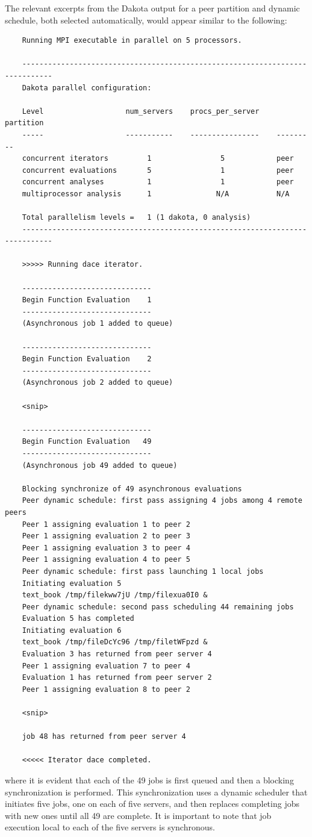 The relevant excerpts from the Dakota output for a peer
partition and dynamic schedule, both selected automatically, would appear 
similar to the following:
\begin{small}
\begin{verbatim}
    Running MPI executable in parallel on 5 processors.

    -----------------------------------------------------------------------------
    Dakota parallel configuration:

    Level                   num_servers    procs_per_server    partition
    -----                   -----------    ----------------    ---------
    concurrent iterators         1                5            peer
    concurrent evaluations       5                1            peer
    concurrent analyses          1                1            peer
    multiprocessor analysis      1               N/A           N/A

    Total parallelism levels =   1 (1 dakota, 0 analysis)
    -----------------------------------------------------------------------------

    >>>>> Running dace iterator.

    ------------------------------
    Begin Function Evaluation    1
    ------------------------------
    (Asynchronous job 1 added to queue)

    ------------------------------
    Begin Function Evaluation    2
    ------------------------------
    (Asynchronous job 2 added to queue)

    <snip>

    ------------------------------
    Begin Function Evaluation   49
    ------------------------------
    (Asynchronous job 49 added to queue)

    Blocking synchronize of 49 asynchronous evaluations
    Peer dynamic schedule: first pass assigning 4 jobs among 4 remote peers
    Peer 1 assigning evaluation 1 to peer 2
    Peer 1 assigning evaluation 2 to peer 3
    Peer 1 assigning evaluation 3 to peer 4
    Peer 1 assigning evaluation 4 to peer 5
    Peer dynamic schedule: first pass launching 1 local jobs
    Initiating evaluation 5
    text_book /tmp/filekww7jU /tmp/filexua0I0 &
    Peer dynamic schedule: second pass scheduling 44 remaining jobs
    Evaluation 5 has completed
    Initiating evaluation 6
    text_book /tmp/fileDcYc96 /tmp/filetWFpzd &
    Evaluation 3 has returned from peer server 4
    Peer 1 assigning evaluation 7 to peer 4
    Evaluation 1 has returned from peer server 2
    Peer 1 assigning evaluation 8 to peer 2

    <snip>

    job 48 has returned from peer server 4

    <<<<< Iterator dace completed.
\end{verbatim}
\end{small}
where it is evident that each of the 49 jobs is first queued and then
a blocking synchronization is performed.  This synchronization uses a
dynamic scheduler that initiates five jobs, one on each of five servers, 
and then replaces completing jobs with new ones until all 49 are complete. 
It is important to note that job execution local to each of the five servers 
is synchronous.


